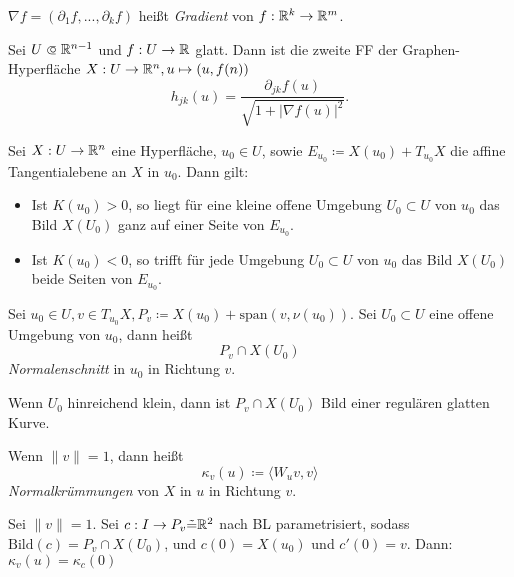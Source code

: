 \documentclass{cheat-sheet}
\newcommand{\Span}{\mathrm{span}}
\newcommand{\Bild}{\mathrm{Bild}}
\newcommand\opn{\mathrel{\ooalign{$\subset$\cr
  \hidewidth\raise.1ex\hbox{$\circ\mkern.5mu$}\cr}}}
\begin{document}
\begin{nota}
  $\nabla f = (\partial_1 f, ..., \partial_k f)$ heißt \emph{Gradient} von $f : \mathbb{R}^k \to \mathbb{R}^m$.
\end{nota}

\begin{satz}
  Sei $U \opn \R^{n-1}$ und $f : U \to \mathbb{R}$ glatt. Dann ist die zweite FF der Graphen-Hyperfläche $X : U \to \mathbb{R}^n, u \mapsto (u, f(n))$
  \[ h_{jk}(u) = \frac{\partial_{jk} f(u)}{\sqrt{1 + |\nabla f(u)|^2}}. \]
\end{satz}

\begin{satz}
  Sei $X : U \to \mathbb{R}^n$ eine Hyperfläche, $u_0 \in U$, sowie $E_{u_0} \coloneqq X(u_0) + T_{u_0} X$ die affine Tangentialebene an $X$ in $u_0$. Dann gilt:
  \begin{itemize}
    \item Ist $K(u_0) > 0$, so liegt für eine kleine offene Umgebung $U_0 \subset U$ von $u_0$ das Bild $X(U_0)$ ganz auf einer Seite von $E_{u_0}$.
    \item Ist $K(u_0) < 0$, so trifft für jede Umgebung $U_0 \subset U$ von $u_0$ das Bild $X(U_0)$ beide Seiten von $E_{u_0}$.
  \end{itemize}
\end{satz}


\begin{defn}
  Sei $u_0 \in U, v \in T_{u_0} X, P_v \coloneqq X(u_0) + \Span(v, \nu(u_0))$.
  Sei $U_0 \subset U$ eine offene Umgebung von $u_0$, dann heißt
  \[ P_v \cap X(U_0) \]
  \emph{Normalenschnitt} in $u_0$ in Richtung $v$.
\end{defn}

\begin{satz}
  Wenn $U_0$ hinreichend klein, dann ist $P_v \cap X(U_0)$ Bild einer regulären glatten Kurve.
\end{satz}

\begin{defn}
  Wenn $\| v \| = 1$, dann heißt
  \[ \kappa_v(u) \coloneqq \langle W_u v, v \rangle \]
  \emph{Normalkrümmungen} von $X$ in $u$ in Richtung $v$.
\end{defn}

\begin{bem}
  Sei $\|v\| = 1$. Sei $c : I \to P_v \tilde{=} \mathbb{R}^2$ nach BL parametrisiert, sodass $\Bild(c) = P_v \cap X(U_0)$, und $c(0) = X(u_0)$ und $c'(0) = v$. Dann: $\kappa_v(u) = \kappa_c(0)$
\end{bem}
\end{document}
